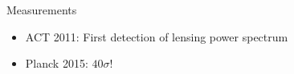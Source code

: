 \documentclass[table]{beamer}
\begin{document}
\begin{frame}{Measurements}
	\centering
	\begin{itemize}
		\item<1-> ACT 2011: First detection of lensing power spectrum
		\item<2-> Planck 2015: $40\sigma$!
	\end{itemize}
\end{frame}
\end{document}
